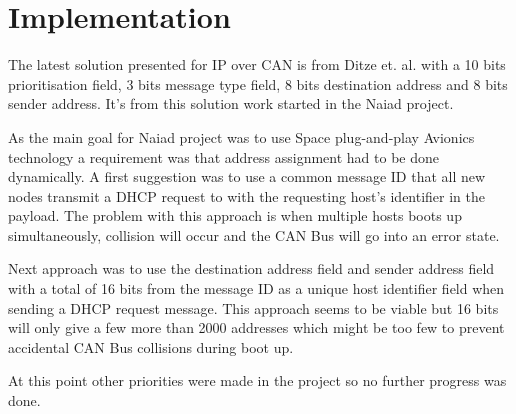 \section{Implementation}\label{sec:implementation}
The latest solution presented for IP over CAN is from Ditze et. al. with a 10
bits prioritisation field, 3 bits message type field, 8 bits destination
address and 8 bits sender address. It's from this solution work started in the
Naiad project.

As the main goal for Naiad project was to use Space plug-and-play Avionics
technology a requirement was that address assignment had to be done
dynamically. A first suggestion was to use a common message ID that all new
nodes transmit a DHCP request to with the requesting host's identifier in the
payload. The problem with this approach is when multiple hosts boots up
simultaneously, collision will occur and the CAN Bus will go into an error
state.

Next approach was to use the destination address field and sender address field
with a total of 16 bits from the message ID as a unique host identifier field
when sending a DHCP request message. This approach seems to be viable but 16
bits will only give a few more than 2000 addresses which might be too few
to prevent accidental CAN Bus collisions during boot up.

At this point other priorities were made in the project so no further progress
was done.
